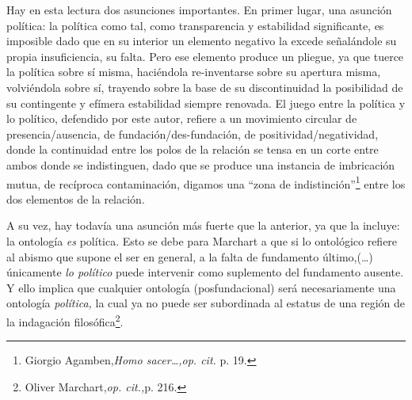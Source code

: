 Hay en esta lectura dos asunciones importantes. En primer lugar, una asunción política: la política como tal, como transparencia y estabilidad significante, es imposible dado que en su interior un elemento negativo la excede señalándole su propia insuficiencia, su falta. Pero ese elemento produce un pliegue, ya que tuerce la política sobre sí misma, haciéndola re-inventarse sobre su apertura misma, volviéndola sobre sí, trayendo sobre la base de su discontinuidad la posibilidad de su contingente y efímera estabilidad siempre renovada. El juego entre la política y lo político, defendido por este autor, refiere a un movimiento circular de presencia/ausencia, de fundación/des-fundación, de positividad/negatividad, donde la continuidad entre los polos de la relación se tensa en un corte entre ambos donde se indistinguen, dado que se produce una instancia de imbricación mutua, de recíproca contaminación, digamos una \enquote{zona de indistinción}\footnote{Giorgio Agamben,\emph{Homo sacer\ldots,op. cit.} p. 19.} entre los dos elementos de la relación.

A su vez, hay todavía una asunción más fuerte que la anterior, ya que la incluye: la ontología \emph{es} política. Esto se debe para Marchart a que si lo ontológico refiere al abismo que supone el ser en general, a la falta de fundamento último,(\dots) únicamente \emph{lo político} puede intervenir como suplemento del fundamento ausente. Y ello implica que cualquier ontología (posfundacional)  será necesariamente una ontología \emph{política,} la cual ya no puede ser subordinada al estatus de una región de la indagación filosófica\footnote{Oliver Marchart,\emph{op. cit.,}p. 216.}.

